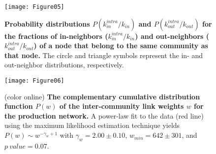 \documentclass[pre,floatfix,twocolumn,showpacs,a4paper,nofootinbib]{revtex4}
\begin{document}
\begin{figure}[t]
\begin{center}
\texttt{[image: Figure05]}
\end{center}
\caption{
{\bf Probability distributions $P(k_{in}^{intra} / k_{in})$ and  $P(k_{out}^{intra} / k_{out})$ for the fractions of in-neighbors ($k_{in}^{intra} / k_{in}$) and out-neighbors ($k_{out}^{intra} / k_{out}$) 
of a node that belong to the same community as that node.}
The circle and triangle symbols represent the in- and out-neighbor distributions, respectively. 
}
\label{fig5}
\end{figure}
\begin{figure}[t]
\begin{center}
\texttt{[image: Figure06]}
\end{center}
\caption{(color online)
{\bf The complementary cumulative distribution function $P(w)$ of the inter-community link weights $w$ for the production network.}
A power-law fit to the data (red line) using the maximum likelihood estimation technique yields $P(w)\sim w^{-\gamma_w +1}$ 
with $\gamma_w =2.00 \pm 0.10$, $w_{min}=642 \pm 301$, and $p~value = 0.07$.
}
\label{fig6}
\end{figure}
\end{document}

